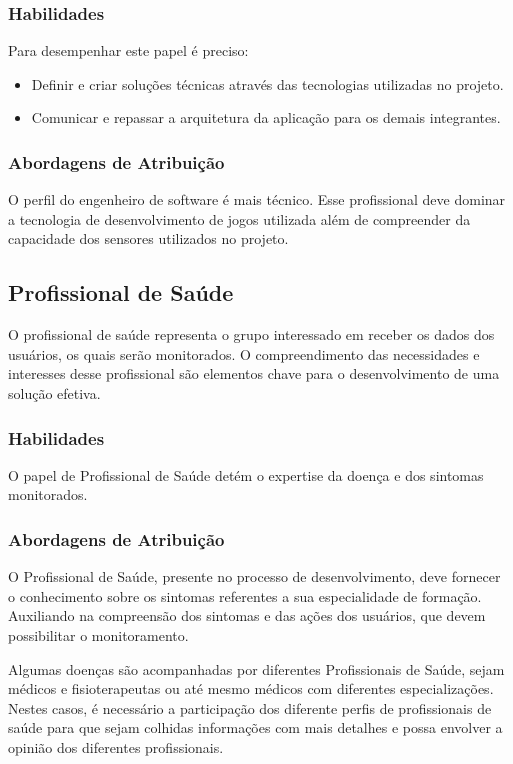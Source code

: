 \subsubsection{Habilidades}
Para desempenhar este papel é preciso:

\begin{itemize}
    \item Definir e criar soluções técnicas através das tecnologias utilizadas no projeto.
		\item Comunicar e repassar a arquitetura da aplicação para os demais integrantes.
\end{itemize}

\subsubsection{Abordagens de Atribuição}
O perfil do engenheiro de software é mais técnico. Esse profissional deve dominar a tecnologia de desenvolvimento de jogos utilizada além de compreender da capacidade dos sensores utilizados no projeto.

\subsection{Profissional de Saúde}\label{subsec:profissional_saude}
O profissional de saúde representa o grupo interessado em receber os dados dos usuários, os quais serão monitorados. O compreendimento das necessidades e interesses desse profissional são elementos chave para o desenvolvimento de uma solução efetiva.

\subsubsection{Habilidades}
O papel de Profissional de Saúde detém o expertise da doença e dos sintomas monitorados.

\subsubsection{Abordagens de Atribuição}
O Profissional de Saúde, presente no processo de desenvolvimento, deve fornecer o conhecimento sobre os sintomas referentes a sua especialidade de formação. Auxiliando na compreensão dos sintomas e das ações dos usuários, que devem possibilitar o monitoramento.

Algumas doenças são acompanhadas por diferentes Profissionais de Saúde, sejam médicos e fisioterapeutas ou até mesmo médicos com diferentes especializações. Nestes casos, é necessário a participação dos diferente perfis de profissionais de saúde para que sejam colhidas informações com mais detalhes e possa envolver a opinião dos diferentes profissionais.




